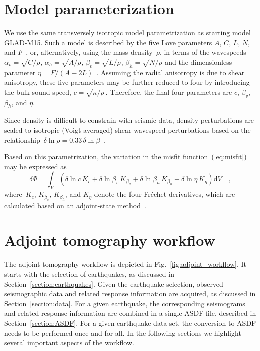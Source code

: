 \documentclass[extra,mreferee]{gji}
\begin{document}
\section{Model parameterization}
\label{section:parameterization}

We use the same transversely isotropic model parametrization as starting model GLAD-M15.
Such a model is described by the five Love parameters $A$, $C$, $L$, $N$, and $F$~\citep{Love27},
or, alternatively, using the mass density~$\rho$, in terms of the wavespeeds~$\alpha_v=\sqrt{C/\rho}$, $\alpha_h=\sqrt{A/\rho}$, $\beta_v=\sqrt{L/\rho}$, $\beta_h=\sqrt{N/\rho}$ and the dimensionless parameter $\eta=F/(A-2L)$~\citep{PREM,DT98}.
Assuming the radial anisotropy is due to shear anisotropy, these five parameters
may be further reduced to four by introducing the bulk sound speed,
$c=\sqrt{\kappa/\rho}$\,.
Therefore, the final four parameters are $c$, $\beta_v$, $\beta_h$, and $\eta$.

Since density is difficult to constrain with seismic data,
density perturbations are scaled to isotropic (Voigt averaged) shear wavespeed perturbations based on the relationship~$\delta\ln\rho = 0.33\,\delta\ln\beta$~\citep{montagner1989petrological}.

Based on this parametrization,
the variation in the misfit function~(\ref{eq:misfit}) may be expressed as~\citep{zhu2015seismic,bozdaug2016global}
\begin{equation}
    \delta \Phi = \int_V
      (\delta \ln c\,K_c + \delta \ln\beta_v\,K_{\beta_v} + \delta \ln\beta_h\,K_{\beta_h} +
      \delta\ln\eta\,K_\eta) \mathrm{d}V
      \quad ,
\end{equation}
where~$K_c$, $K_{\beta_v}$, $K_{\beta_h}$, and $K_\eta$ denote the four Fr\'echet derivatives,
which are calculated based on an adjoint-state method~\citep[e.g.,][]{Plessix_2006_RAS,Tromp2005}.

\section{Adjoint tomography workflow}
\label{section:workflow}

The adjoint tomography workflow is depicted in Fig.~\ref{fig:adjoint_workflow}.
It starts with the selection of earthquakes, as discussed in Section~\ref{section:earthquakes}.
Given the earthquake selection,
observed seismographic data and related response information are acquired,
as discussed in Section~\ref{section:data}.
For a given earthquake,
the corresponding seismograms and related response information are combined in a single ASDF file,
described in Section~\ref{section:ASDF}.
For a given earthquake data set, the conversion to ASDF needs to be performed once and for all.
In the following sections we highlight several important aspects of the workflow.
\end{document}
